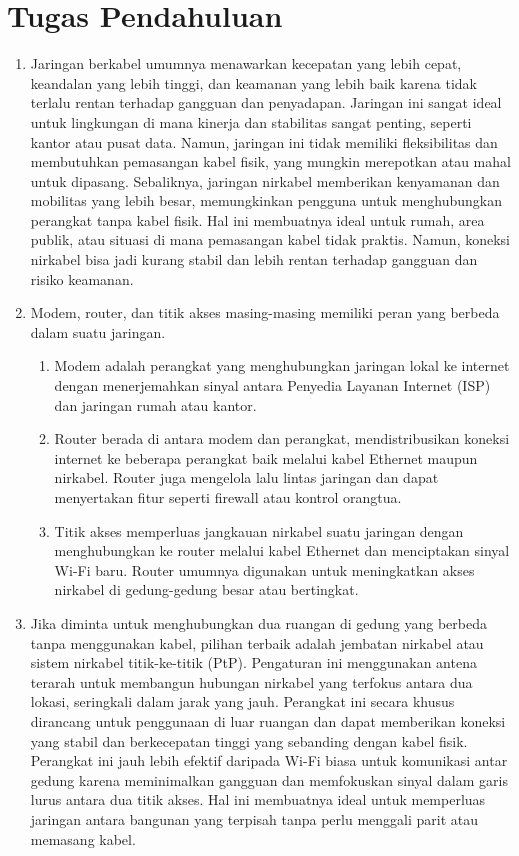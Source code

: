 \section{Tugas Pendahuluan}
\begin{enumerate}
	\item Jaringan berkabel umumnya menawarkan kecepatan yang 
	lebih cepat, keandalan yang lebih tinggi, dan keamanan yang 
	lebih baik karena tidak terlalu rentan terhadap gangguan dan 
	penyadapan. Jaringan ini sangat ideal untuk lingkungan di 
	mana kinerja dan stabilitas sangat penting, seperti kantor 
	atau pusat data. Namun, jaringan ini tidak memiliki 
	fleksibilitas dan membutuhkan pemasangan kabel fisik, yang 
	mungkin merepotkan atau mahal untuk dipasang. Sebaliknya, 
	jaringan nirkabel memberikan kenyamanan dan mobilitas yang 
	lebih besar, memungkinkan pengguna untuk menghubungkan 
	perangkat tanpa kabel fisik. Hal ini membuatnya ideal untuk 
	rumah, area publik, atau situasi di mana pemasangan kabel 
	tidak praktis. Namun, koneksi nirkabel bisa jadi kurang 
	stabil dan lebih rentan terhadap gangguan dan risiko 
	keamanan.
	\item Modem, router, dan titik akses masing-masing memiliki 
	peran yang berbeda dalam suatu jaringan. 
	\begin{enumerate}
		\item Modem adalah perangkat yang menghubungkan 
		jaringan lokal ke internet dengan menerjemahkan sinyal 
		antara Penyedia Layanan Internet (ISP) dan jaringan rumah 
		atau kantor.
		\item Router berada di antara modem dan perangkat, 
		mendistribusikan koneksi internet ke beberapa perangkat 
		baik melalui kabel Ethernet maupun nirkabel. Router juga 
		mengelola lalu lintas jaringan dan dapat menyertakan fitur 
		seperti firewall atau kontrol orangtua.
		\item Titik akses memperluas jangkauan nirkabel suatu 
		jaringan dengan menghubungkan ke router melalui kabel 
		Ethernet dan menciptakan sinyal Wi-Fi baru. Router 
		umumnya digunakan untuk meningkatkan akses nirkabel di 
		gedung-gedung besar atau bertingkat.
	\end{enumerate}  
	\item Jika diminta untuk menghubungkan dua ruangan di gedung 
	yang berbeda tanpa menggunakan kabel, pilihan terbaik adalah 
	jembatan nirkabel atau sistem nirkabel titik-ke-titik (PtP). 
	Pengaturan ini menggunakan antena terarah untuk membangun 
	hubungan nirkabel yang terfokus antara dua lokasi, 
	seringkali dalam jarak yang jauh. Perangkat ini secara 
	khusus dirancang untuk penggunaan di luar ruangan dan dapat 
	memberikan koneksi yang stabil dan berkecepatan tinggi yang 
	sebanding dengan kabel fisik. Perangkat ini jauh lebih 
	efektif daripada Wi-Fi biasa untuk komunikasi antar gedung 
	karena meminimalkan gangguan dan memfokuskan sinyal dalam 
	garis lurus antara dua titik akses. Hal ini membuatnya ideal 
	untuk memperluas jaringan antara bangunan yang terpisah 
	tanpa perlu menggali parit atau memasang kabel.
\end{enumerate}